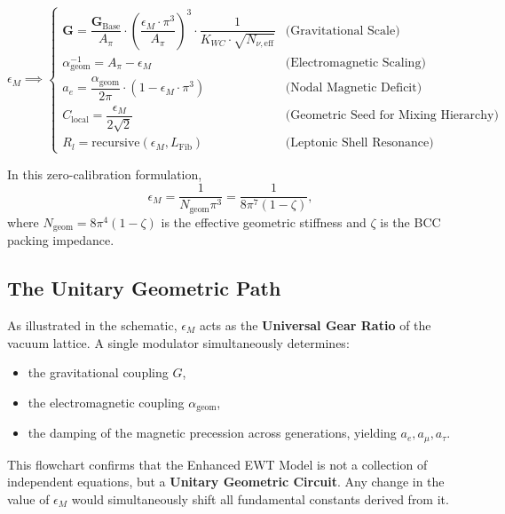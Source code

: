 \documentclass[10pt,a4paper]{article}
\begin{document}
\begin{equation}
	\label{EWT:flowchart}
	\epsilon_M \implies 
	\begin{cases} 
		\mathbf{G} = \dfrac{\mathbf{G}_{\text{Base}}}{A_\pi} \cdot \left( \dfrac{\epsilon_M \cdot \pi^3}{A_\pi} \right)^3 \cdot \dfrac{1}{K_{WC} \cdot \sqrt{N_{\nu,\text{eff}}}} & \text{(Gravitational Scale)} \\[4pt]
		\alpha_{\text{geom}}^{-1} = A_\pi - \epsilon_M & \text{(Electromagnetic Scaling)} \\[4pt]
		a_e = \dfrac{\alpha_{\text{geom}}}{2\pi} \cdot \left( 1 - \epsilon_M \cdot \pi^3 \right) & \text{(Nodal Magnetic Deficit)} \\[4pt]
		C_{\text{local}} = \dfrac{\epsilon_M}{2\sqrt{2}} & \text{(Geometric Seed for Mixing Hierarchy)} \\[4pt]
		R_l = \text{recursive}(\epsilon_M, L_{\text{Fib}}) & \text{(Leptonic Shell Resonance)}
	\end{cases}
\end{equation}

In this zero-calibration formulation,
\begin{equation}
	\epsilon_M
	=
	\frac{1}{N_{\text{geom}}\pi^3}
	=
	\frac{1}{8\pi^7(1-\zeta)},
\end{equation}
where \(N_{\text{geom}} = 8\pi^4(1-\zeta)\) is the effective geometric stiffness and \(\zeta\) is the BCC packing impedance.

\subsection{The Unitary Geometric Path}

As illustrated in the schematic, \(\epsilon_M\) acts as the \textbf{Universal Gear Ratio} of the vacuum lattice. A single modulator simultaneously determines:
\begin{itemize}
	\item the gravitational coupling \(G\),
	\item the electromagnetic coupling \(\alpha_{\text{geom}}\),
	\item the damping of the magnetic precession across generations, yielding \(a_e, a_\mu, a_\tau\).
\end{itemize}

This flowchart confirms that the Enhanced EWT Model is not a collection of independent equations, but a \textbf{Unitary Geometric Circuit}. Any change in the value of \(\epsilon_M\) would simultaneously shift all fundamental constants derived from it.
\end{document}
